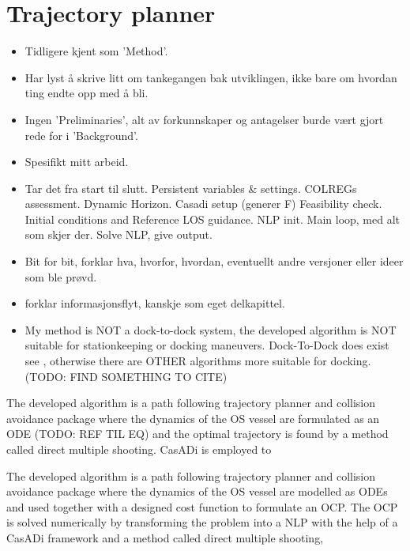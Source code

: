 \section{Trajectory planner}

\begin{itemize}
    \item Tidligere kjent som 'Method'.
    \item Har lyst å skrive litt om tankegangen bak utviklingen, ikke bare om hvordan ting endte opp med å bli.
    \item Ingen 'Preliminaries', alt av forkunnskaper og antagelser burde vært gjort rede for i 'Background'.
    \item Spesifikt mitt arbeid.
    \item Tar det fra start til slutt. 
    \subitem Persistent variables \& settings.
    \subitem COLREGs assessment.
    \subitem Dynamic Horizon.
    \subitem Casadi setup (generer F)
    \subitem Feasibility check.
    \subitem Initial conditions and Reference LOS guidance.
    \subitem NLP init.
    \subitem Main loop, med alt som skjer der.
    \subitem Solve NLP, give output.
    \item Bit for bit, forklar hva, hvorfor, hvordan, eventuellt andre versjoner eller ideer som ble prøvd.
    \item forklar informasjonsflyt, kanskje som eget delkapittel. 
    \item My method is NOT a dock-to-dock system, the developed algorithm is NOT suitable for stationkeeping or docking maneuvers.
    Dock-To-Dock does exist see \cite{WärtsiläDockToDock}, 
    otherwise there are OTHER algorithms more suitable for docking. (TODO: FIND SOMETHING TO CITE)
\end{itemize} 



\iffalse
The developed algorithm is a path following trajectory planner and collision avoidance package where the dynamics of the \gls{OS}
vessel are formulated as an ODE (TODO: REF TIL EQ) and the optimal trajectory is found by a method called direct multiple shooting.
CasADi is employed to 

The developed algorithm is a path following trajectory planner and collision avoidance package where the dynamics of the \gls{OS} vessel
are modelled as ODEs and used together with a designed cost function to formulate an \gls{OCP}. The \gls{OCP} is solved numerically
by transforming the problem into a \gls{NLP} with the help of a CasADi framework and a method called direct multiple shooting, 

